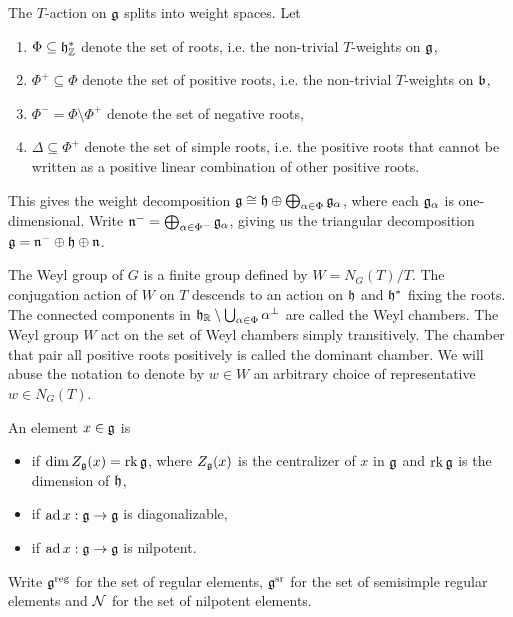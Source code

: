 The $T$-action on $\mathfrak{g}$ splits into weight spaces. Let
\begin{enumerate}
    \item $\Phi \subseteq \mathfrak{h}_\mathbb{Z}^*$ denote the set of roots, i.e. the non-trivial $T$-weights on $\mathfrak{g}$,
    \item $\Phi^+ \subseteq \Phi$ denote the set of positive roots, i.e. the non-trivial $T$-weights on $\mathfrak{b}$,
    \item $\Phi^- = \Phi \setminus \Phi^+$ denote the set of negative roots,
    \item $\Delta \subseteq \Phi^+$ denote the set of simple roots, i.e. the positive roots that cannot be written as a positive linear combination of other positive roots.
\end{enumerate}
This gives the weight decomposition $\mathfrak{g} \cong \mathfrak{h} \oplus \bigoplus_{\alpha \in \Phi} \mathfrak{g}_\alpha$, where each $\mathfrak{g}_\alpha$ is one-dimensional. Write $\mathfrak{n}^- = \bigoplus_{\alpha \in \Phi^-} \mathfrak{g}_\alpha$, giving us the triangular decomposition $\mathfrak{g} = \mathfrak{n}^- \oplus \mathfrak{h} \oplus \mathfrak{n}$.

The Weyl group of $G$ is a finite group defined by $W = N_G(T)/T$. The conjugation action of $W$ on $T$ descends to an action on $\mathfrak{h}$ and $\mathfrak{h}^*$ fixing the roots. The connected components in $\mathfrak{h}_\mathbb{R} \setminus \bigcup_{\alpha \in \Phi} \alpha^\perp$ are called the Weyl chambers. The Weyl group $W$ act on the set of Weyl chambers simply transitively. The chamber that pair all positive roots positively is called the dominant chamber. We will abuse the notation to denote by $w \in W$ an arbitrary choice of representative $w \in N_G(T)$.

\begin{definition}[def:]{}
    An element $x \in \mathfrak{g}$ is
    \begin{itemize}
        \item {} if $\dim Z_{\mathfrak{g}}(x) = \operatorname{rk} \mathfrak{g}$, where $Z_{\mathfrak{g}}(x)$ is the centralizer of $x$ in $\mathfrak{g}$ and $\operatorname{rk} \mathfrak{g}$ is the dimension of $\mathfrak{h}$,
        \item {} if $\operatorname{ad} x : \mathfrak{g} \to \mathfrak{g}$ is diagonalizable,
        \item {} if $\operatorname{ad} x : \mathfrak{g} \to \mathfrak{g}$ is nilpotent.
    \end{itemize}
    Write $\mathfrak{g}^{\mathrm{reg}}$ for the set of regular elements, $\mathfrak{g}^{\mathrm{sr}}$ for the set of semisimple regular elements and $\mathcal{N}$ for the set of nilpotent elements.
\end{definition}

